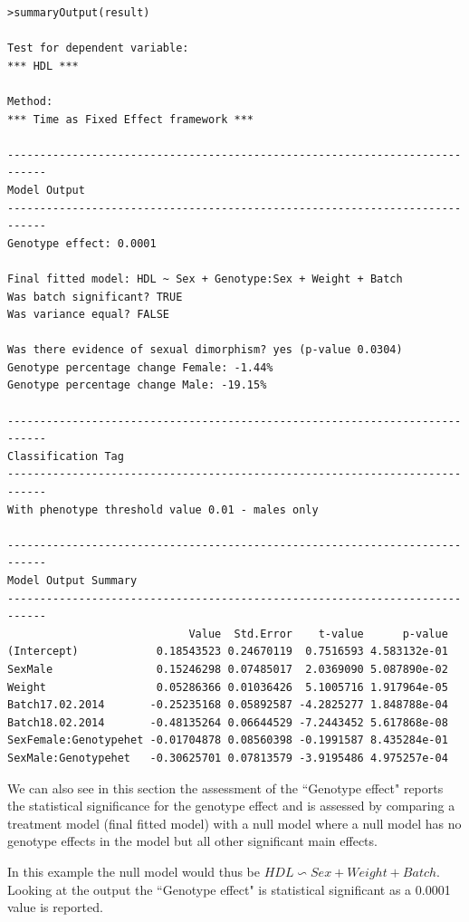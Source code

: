 \documentclass[12pt,a4paper]{article}
\begin{document}
\begingroup
\fontsize{8pt}{12pt}\selectfont
\begin{verbatim}
>summaryOutput(result)

Test for dependent variable:
*** HDL ***

Method:
*** Time as Fixed Effect framework ***

----------------------------------------------------------------------------
Model Output
----------------------------------------------------------------------------
Genotype effect: 0.0001

Final fitted model: HDL ~ Sex + Genotype:Sex + Weight + Batch
Was batch significant? TRUE
Was variance equal? FALSE

Was there evidence of sexual dimorphism? yes (p-value 0.0304)
Genotype percentage change Female: -1.44%
Genotype percentage change Male: -19.15%

----------------------------------------------------------------------------
Classification Tag
----------------------------------------------------------------------------
With phenotype threshold value 0.01 - males only

----------------------------------------------------------------------------
Model Output Summary
----------------------------------------------------------------------------
                            Value  Std.Error    t-value      p-value
(Intercept)            0.18543523 0.24670119  0.7516593 4.583132e-01
SexMale                0.15246298 0.07485017  2.0369090 5.087890e-02
Weight                 0.05286366 0.01036426  5.1005716 1.917964e-05
Batch17.02.2014       -0.25235168 0.05892587 -4.2825277 1.848788e-04
Batch18.02.2014       -0.48135264 0.06644529 -7.2443452 5.617868e-08
SexFemale:Genotypehet -0.01704878 0.08560398 -0.1991587 8.435284e-01
SexMale:Genotypehet   -0.30625701 0.07813579 -3.9195486 4.975257e-04
\end{verbatim}
\endgroup 

We can also see in this section the assessment of the “Genotype effect" reports the statistical significance for the genotype effect and is assessed by comparing a treatment model (final fitted model) with a null model where a null model has no genotype effects in the model but all other significant main effects. 

In this example the null model would thus be $HDL \backsim Sex + Weight + Batch$. Looking at the output the “Genotype effect" is statistical significant as a 0.0001 value is reported. 
\end{document}
